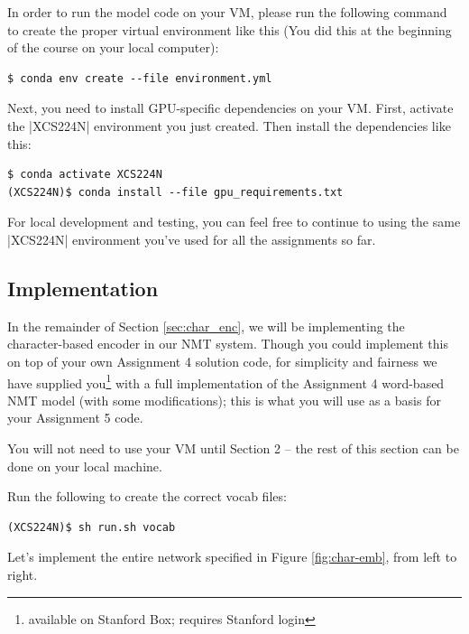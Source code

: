 In order to run the model code on your VM, please run the following command to create the proper virtual environment like this (You did this at the beginning of the course on your local computer):

\begin{lstlisting}
$ conda env create --file environment.yml
\end{lstlisting}

Next, you need to install GPU-specific dependencies on your VM.  First, activate the |XCS224N| environment you just created.  Then install the dependencies like this:

\begin{lstlisting}
$ conda activate XCS224N
(XCS224N)$ conda install --file gpu_requirements.txt
\end{lstlisting}

For local development and testing, you can feel free to continue to using the same |XCS224N| environment you've used for all the assignments so far.

\subsection*{Implementation}
In the remainder of Section \ref{sec:char_enc}, we will be implementing the character-based encoder in our NMT system.
Though you could implement this on top of your own Assignment 4 solution code, for simplicity and fairness we have supplied you\footnote{available on Stanford Box; requires Stanford login} with a full implementation of the Assignment 4 word-based NMT model (with some modifications); this is what you will use as a basis for your Assignment 5 code. 

You will not need to use your VM until Section 2 -- the rest of this section can be done on your local machine.

Run the following to create the correct vocab files:
\begin{lstlisting}
(XCS224N)$ sh run.sh vocab
\end{lstlisting}

Let's implement the entire network specified in Figure \ref{fig:char-emb}, from left to right.

